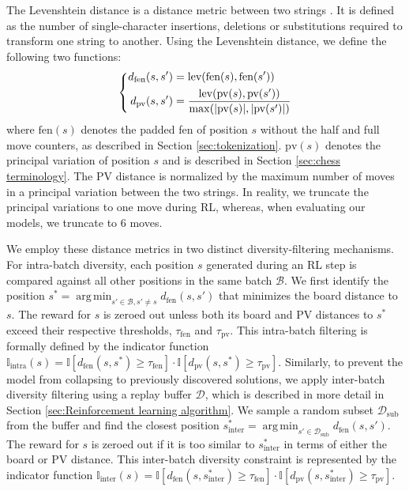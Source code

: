 The Levenshtein distance is a distance metric between two strings \cite{li2007normalizedlevenshteindistance}. It is defined as the number of single-character insertions, deletions or substitutions required to transform one string to another. Using the Levenshtein distance, we define the following two functions:
\begin{equation}
    \left\{
    \begin{aligned}
        d_{\mathrm{fen}}(s, s') &= \text{lev}(\text{fen}(s), \text{fen}(s')) \\
        d_{\mathrm{pv}}(s, s') &= \frac{\text{lev}(\text{pv}(s), \text{pv}(s'))}{\max(\abs{\text{pv}(s)}, \abs{\text{pv}(s')})}
    \end{aligned}
    \right.
    \label{eq:distance metrics}
\end{equation}
where $\text{fen}(s)$ denotes the padded fen of position $s$ without the half and full move counters, as described in Section \ref{sec:tokenization}. $\text{pv}(s)$ denotes the principal variation of position $s$ and is described in Section \ref{sec:chess terminology}. The PV distance is normalized by the maximum number of moves in a principal variation between the two strings. In reality, we truncate the principal variations to one move during RL, whereas, when evaluating our models, we truncate to 6 moves.

We employ these distance metrics in two distinct diversity-filtering mechanisms. For intra-batch diversity, each position $s$ generated during an RL step is compared against all other positions in the same batch $\mathcal{B}$. We first identify the position $s^* = \operatorname*{arg\,min}_{s'\in \mathcal{B}, s' \neq s} d_{\text{fen}}(s, s')$ that minimizes the board distance to $s$. The reward for $s$ is zeroed out unless both its board and PV distances to $s^*$ exceed their respective thresholds, $\tau_{\text{fen}}$ and $\tau_{\text{pv}}$. This intra-batch filtering is formally defined by the indicator function $\mathbb{I}_{\text{intra}}(s) = \mathbb{I}[d_{\text{fen}}(s, s^*) \geq \tau_{\text{fen}}] \cdot \mathbb{I}[d_{\text{pv}}(s, s^*) \geq \tau_{\text{pv}}]$. Similarly, to prevent the model from collapsing to previously discovered solutions, we apply inter-batch diversity filtering using a replay buffer $\mathcal{D}$, which is described in more detail in Section \ref{sec:Reinforcement learning algorithm}. We sample a random subset $\mathcal{D}_{\text{sub}}$ from the buffer and find the closest position $s^*_{\text{inter}} = \operatorname*{arg\,min}_{s'\in \mathcal{D}_{\text{sub}}} d_{\text{fen}}(s, s')$. The reward for $s$ is zeroed out if it is too similar to $s^*_{\text{inter}}$ in terms of either the board or PV distance. This inter-batch diversity constraint is represented by the indicator function $\mathbb{I}_{\text{inter}}(s) = \mathbb{I}[d_{\text{fen}}(s, s^*_{\text{inter}}) \geq \tau_{\text{fen}}] \cdot \mathbb{I}[d_{\text{pv}}(s, s^*_{\text{inter}}) \geq \tau_{\text{pv}}]$.

